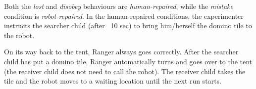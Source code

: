 \documentclass{sig-alternate}
\begin{document}
%
%
%
%


Both the \textit{lost} and \emph{disobey} behaviours are
\textit{human-repaired}, while the \emph{mistake} condition is
\emph{robot-repaired}. In the human-repaired conditions, the experimenter
instructs the searcher child (after ~10 sec) to bring him/herself the domino
tile to the robot.

On its way back to the tent, Ranger always goes correctly. After the searcher
child has put a domino tile, Ranger automatically turns and goes over to the
tent (the receiver child does not need to call the robot). The receiver child
takes the tile and the robot moves to a waiting location until the next run
starts.
\end{document}
